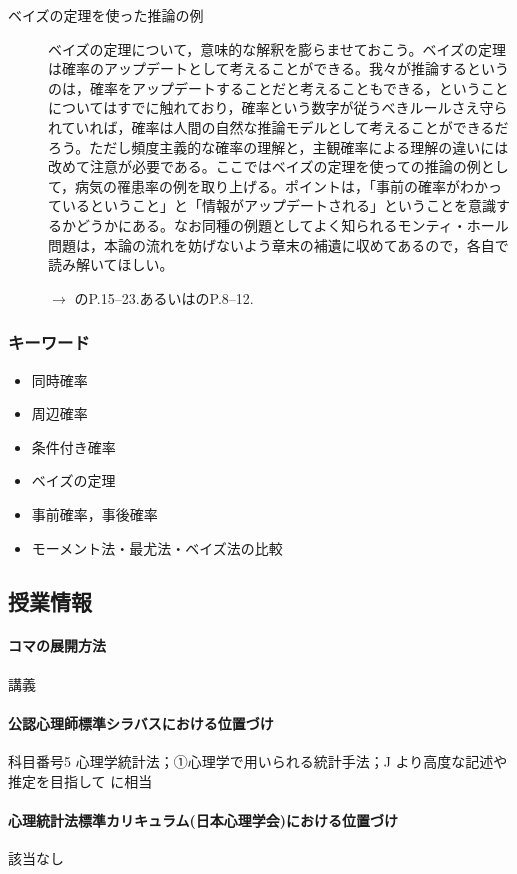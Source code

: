 \begin{description}
	\item[ベイズの定理を使った推論の例]ベイズの定理について，意味的な解釈を膨らませておこう。ベイズの定理は確率のアップデートとして考えることができる。我々が推論するというのは，確率をアップデートすることだと考えることもできる，ということについてはすでに触れており，確率という数字が従うべきルールさえ守られていれば，確率は人間の自然な推論モデルとして考えることができるだろう。ただし頻度主義的な確率の理解と，主観確率による理解の違いには改めて注意が必要である。ここではベイズの定理を使っての推論の例として，病気の罹患率の例を取り上げる。ポイントは，「事前の確率がわかっているということ」と「情報がアップデートされる」ということを意識するかどうかにある。なお同種の例題としてよく知られるモンティ・ホール問題は，本論の流れを妨げないよう章末の補遺に収めてあるので，各自で読み解いてほしい。
	      \begin{flushright}
		      $\to$ \textcite{Maeda2017}のP.15--23.あるいは\textcite{Toyoda201506}のP.8--12.
	      \end{flushright}

\end{description}
\subsubsection{キーワード}
\begin{itemize}
	\item 同時確率
	\item 周辺確率
	\item 条件付き確率
	\item ベイズの定理
	\item 事前確率，事後確率
	\item モーメント法・最尤法・ベイズ法の比較
\end{itemize}
\subsection{授業情報}
\paragraph{コマの展開方法}
講義
\paragraph{公認心理師標準シラバスにおける位置づけ}
科目番号5 心理学統計法；①心理学で用いられる統計手法；J より高度な記述や推定を目指して に相当
\paragraph{心理統計法標準カリキュラム(日本心理学会)における位置づけ}
該当なし
